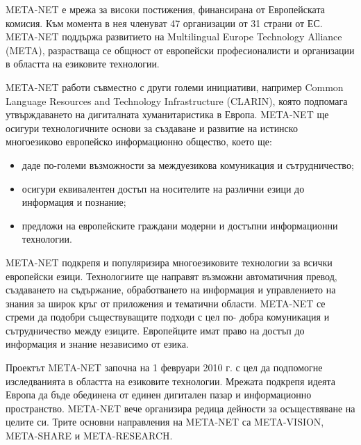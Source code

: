 \begin{multicols}{2}

META-NET е мрежа за високи постижения, финансирана
 от Европейската комисия. Към момента в нея членуват
 47 организации от 31 страни от ЕС. META-NET поддържа
 развитието на  Multilingual Europe Technology Alliance
 (META),  разрастваща се общност от европейски професионалисти и организации в областта на езиковите технологии.

META-NET работи съвместно с други големи инициативи, например Common Language Resources and Technology Infrastructure (CLARIN), която подпомага утвърждаването на дигиталната хуманитаристика в Европа. META-NET ще осигури  технологичните основи за създаване и развитие на истинско многоезиково европейско информационно общество, което ще:
\begin{itemize}
\item даде по-големи възможности за междуезикова комуникация и сътрудничество;
\item осигури еквивалентен достъп на носителите на различни езици до информация и познание;
\item предложи на европейските граждани модерни и достъпни информационни
 технологии.
\end{itemize}

META-NET подкрепя и популяризира многоезиковите технологии за всички европейски езици. Технологиите ще
направят възможни автоматичния превод, създаването на
 съдържание, обработването на информация и управлението на знания за широк кръг от приложения и тематични области. META-NET се стреми да подобри съществуващите подходи с цел по-
добра комуникация и сътрудничество между езиците.
 Европейците имат право на достъп до информация и
 знание независимо от езика.

Проектът META-NET започна на 1 февруари 2010 г. с цел да подпомогне изследванията в областта на езиковите
 технологии. Мрежата подкрепя идеята Европа да бъде обединена от единен дигитален пазар и информационно
 пространство. META-NET вече организира редица дейности за осъществяване на целите си. Трите основни направления на META-NET са
 META-VISION,
 META-SHARE
 и
 META-RESEARCH.
 

\end{multicols}

